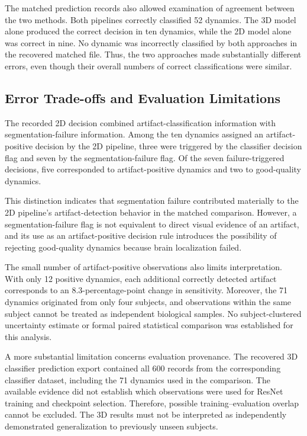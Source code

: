 The matched prediction records also allowed examination of agreement between the two methods. Both pipelines correctly classified 52 dynamics. The 3D model alone produced the correct decision in ten dynamics, while the 2D model alone was correct in nine. No dynamic was incorrectly classified by both approaches in the recovered matched file. Thus, the two approaches made substantially different errors, even though their overall numbers of correct classifications were similar.

\subsection{Error Trade-offs and Evaluation Limitations}
\label{subsec:results_matched_pipeline_limitations}

The recorded 2D decision combined artifact-classification information with segmentation-failure information. Among the ten dynamics assigned an artifact-positive decision by the 2D pipeline, three were triggered by the classifier decision flag and seven by the segmentation-failure flag. Of the seven failure-triggered decisions, five corresponded to artifact-positive dynamics and two to good-quality dynamics.

This distinction indicates that segmentation failure contributed materially to the 2D pipeline's artifact-detection behavior in the matched comparison. However, a segmentation-failure flag is not equivalent to direct visual evidence of an artifact, and its use as an artifact-positive decision rule introduces the possibility of rejecting good-quality dynamics because brain localization failed.

The small number of artifact-positive observations also limits interpretation. With only 12 positive dynamics, each additional correctly detected artifact corresponds to an 8.3-percentage-point change in sensitivity. Moreover, the 71 dynamics originated from only four subjects, and observations within the same subject cannot be treated as independent biological samples. No subject-clustered uncertainty estimate or formal paired statistical comparison was established for this analysis.

A more substantial limitation concerns evaluation provenance. The recovered 3D classifier prediction export contained all 600 records from the corresponding classifier dataset, including the 71 dynamics used in the comparison. The available evidence did not establish which observations were used for ResNet training and checkpoint selection. Therefore, possible training--evaluation overlap cannot be excluded. The 3D results must not be interpreted as independently demonstrated generalization to previously unseen subjects.

